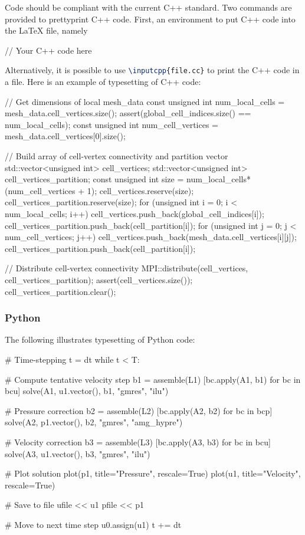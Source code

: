 \documentclass{ansarticle}
\begin{document}
Code should be compliant with the current C++ standard. Two commands
are provided to prettyprint C++ code. First, an environment to put C++
code into the LaTeX file, namely

\begin{latexcode}
\begin{c++}
  // Your C++ code here
\end{c++}
\end{latexcode}

Alternatively, it is possible to use
\lstinline[language=TeX]!\inputcpp{file.cc}!  to print the C++ code in
a file. Here is an example of typesetting of C++ code:

\begin{c++}
// Get dimensions of local mesh_data
const unsigned int num_local_cells = mesh_data.cell_vertices.size();
assert(global_cell_indices.size() == num_local_cells);
const unsigned int num_cell_vertices = mesh_data.cell_vertices[0].size();

// Build array of cell-vertex connectivity and partition vector
std::vector<unsigned int> cell_vertices;
std::vector<unsigned int> cell_vertices_partition;
const unsigned int size = num_local_cells*(num_cell_vertices + 1);
cell_vertices.reserve(size);
cell_vertices_partition.reserve(size);
for (unsigned int i = 0; i < num_local_cells; i++)
{
  cell_vertices.push_back(global_cell_indices[i]);
  cell_vertices_partition.push_back(cell_partition[i]);
  for (unsigned int j = 0; j < num_cell_vertices; j++)
  {
    cell_vertices.push_back(mesh_data.cell_vertices[i][j]);
    cell_vertices_partition.push_back(cell_partition[i]);
  }
}

// Distribute cell-vertex connectivity
MPI::distribute(cell_vertices, cell_vertices_partition);
assert(cell_vertices.size());
cell_vertices_partition.clear();
\end{c++}

\subsubsection{Python}

The following illustrates typesetting of Python code:

\begin{python}
# Time-stepping
t = dt
while t < T:

    # Compute tentative velocity step
    b1 = assemble(L1)
    [bc.apply(A1, b1) for bc in bcu]
    solve(A1, u1.vector(), b1, "gmres", "ilu")

    # Pressure correction
    b2 = assemble(L2)
    [bc.apply(A2, b2) for bc in bcp]
    solve(A2, p1.vector(), b2, "gmres", "amg_hypre")

    # Velocity correction
    b3 = assemble(L3)
    [bc.apply(A3, b3) for bc in bcu]
    solve(A3, u1.vector(), b3, "gmres", "ilu")

    # Plot solution
    plot(p1, title="Pressure", rescale=True)
    plot(u1, title="Velocity", rescale=True)

    # Save to file
    ufile << u1
    pfile << p1

    # Move to next time step
    u0.assign(u1)
    t += dt
\end{python}
\end{document}
